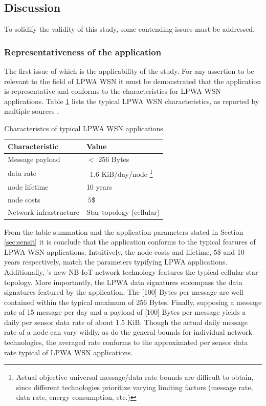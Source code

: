 \subsection{Discussion}
To solidify the validity of this study, some contending issues must be addressed. 

\subsubsection{Representativeness of the \sensit application}
The first issue of which is the applicability of the study. For any assertion to be relevant to the field of LPWA WSN it must be demonstrated that the \sensit application is representative and conforms to the characteristics for LPWA WSN applications. Table \ref{table:LPWA-chars} lists the typical LPWA WSN characteristics, as reported by multiple sources \cite{lora_vs_sigfox_boek, lora_vs_sigfox_whitepaper, nbiot_vs_lora_vs_sigfox, lora_vs_sigfox, tmobile, nbiot}.

\begin{table}
\centering
\begin{tabular}{|l|l|}\hline
Characteristic & Value \\ \hline
Message payload & $<$ 256 Bytes	\\ \hline
data rate &	~1.6 KiB/day/node \footnote{Actual objective universal message/data rate bounds are difficult to obtain, since different technologies prioritize varying limiting factors (message rate, data rate, energy consumption, etc.)}  \\ \hline
node lifetime & 10 years \\ \hline
node costs & $~5$\$ \\ \hline
Network infrastructure & Star topology (cellular)	\\ \hline
\end{tabular}
\caption{Characteristcs of typical LPWA WSN applications}
\label{table:LPWA-chars}
\end{table}

From the table summation and the application parameters stated in Section \ref{sec:sensit} it is conclude that the \sensit application conforms to the typical features of LPWA WSN applications. Intuitively, the node costs and lifetime, 5\$ and 10 years respectively, match the parameters typifying LPWA applications. Additionally, \sensit 's new NB-IoT network technology features the typical cellular star topology. More importantly, the LPWA data signatures encompass the data signatures featured by the \sensit application. The [100] Bytes per message are well contained within the typical maximum of 256 Bytes. Finally, supposing a message rate of 15 message per day and a payload of [100] Bytes per message yields a daily per sensor data rate of about 1.5 KiB. Though the actual daily message rate of a node can vary wildly, as do the general bounds for individual network technologies, the averaged rate conforms to the approximated per sensor data rate typical of LPWA WSN applications.

